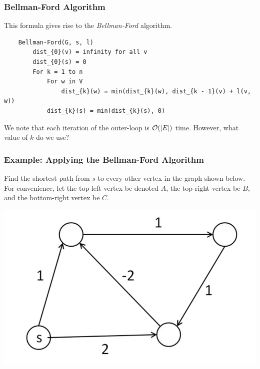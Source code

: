 \documentclass[letterpaper]{article}
\begin{document}
\subsubsection{Bellman-Ford Algorithm}
This formula gives rise to the \emph{Bellman-Ford} algorithm. 
\begin{verbatim}
    Bellman-Ford(G, s, l)
        dist_{0}(v) = infinity for all v 
        dist_{0}(s) = 0
        For k = 1 to n
            For w in V
                dist_{k}(w) = min(dist_{k}(w), dist_{k - 1}(v) + l(v, w))
            dist_{k}(s) = min(dist_{k}(s), 0)
\end{verbatim}
We note that each iteration of the outer-loop is $\mathcal{O}(|E|)$ time. However, what value of $k$ do we use? 

\subsubsection{Example: Applying the Bellman-Ford Algorithm}
Find the shortest path from $s$ to every other vertex in the graph shown below. For convenience, let the top-left vertex be denoted $A$, the top-right vertex be $B$, and the bottom-right vertex be $C$. 
\begin{center}
    \includegraphics[scale=0.4]{assets/shortest_path_problem.png}
\end{center}
\end{document}
